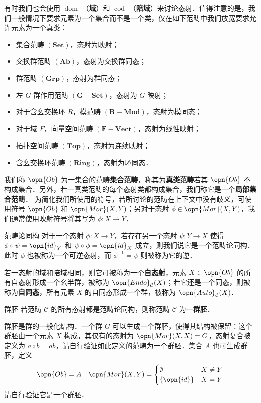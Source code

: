 有时我们也会使用 $\operatorname{dom}$ （\textbf{域}）和 $\operatorname{cod}$ （\textbf{陪域}）来讨论态射．值得注意的是，我们一般情况下要求元素为一个集合而不是一个类，仅在如下范畴中我们放宽要求允许元素为一个真类：
\begin{itemize}
    \item 集合范畴 $(\mathbf{Set})$，态射为映射；
    \item 交换群范畴 $(\mathbf{Ab})$，态射为交换群同态；
    \item 群范畴 $(\mathbf{Grp})$，态射为群同态；
    \item 左 $G$-群作用范畴 $(\mathbf{G{-}Set})$，态射为 $G$-映射；
    \item 对于含幺交换环 $R$，模范畴 $(\mathbf{R{-}Mod})$，态射为模同态；
    \item 对于域 $F$，向量空间范畴 $(\mathbf{F{-}Vect})$，态射为线性映射；
    \item 拓扑空间范畴 $(\mathbf{Top})$，态射为连续映射；
    \item 含幺交换环范畴 $(\mathbf{Ring})$，态射为环同态．
\end{itemize}
我们称 $\opn{Ob}$ 为一集合的范畴\textbf{集合范畴}，称其为\textbf{真类范畴}若其 $\opn{Ob}$ 不构成集合．另外，若一真类范畴的每个态射类都构成集合，我们称它是一个\textbf{局部集合范畴}．
为简化我们所使用的符号，若所讨论的范畴在上下文中没有歧义，可使用符号 $\opn{Ob}$ 和 $\opn{Mor}(X,Y)$；另对于态射 $\phi\in\opn{Mor}(X,Y)$，我们通常使用映射符号将其写为 $\phi:X\to Y$．

\begin{definition}{范畴论同构}
对于一个态射 $\phi:X\to Y$，若存在另一个态射 $\psi:Y\to X$ 使得 $\phi\circ\psi=\opn{id}_Y$ 和 $\psi\circ\phi=\opn{id}_X$ 成立，则我们说它是一个范畴论同构．此时 $\phi$ 也被称为一个可逆态射，而 $\phi^{-1}=\psi$ 则被称为它的逆．
\end{definition}
若一态射的域和陪域相同，则它可被称为一个\textbf{自态射}，元素 $X\in\opn{Ob}$ 的所有自态射形成一个幺半群，被称为 $\opn{Endo}_\mathcal{C}(X)$；若它还是一个同态，则被称为\textbf{自同态}，所有元素 $X$ 的自同态形成一个群，被称为 $\opn{Auto}_\mathcal{C}(X)$．

\begin{definition}{群胚}
若范畴 $\mathcal{C}$ 的所有态射都是范畴论同构，则称范畴 $\mathcal{C}$ 为一\textbf{群胚}．
\end{definition}
群胚是群的一般化结构．一个群 $G$ 可以生成一个群胚，使得其结构被保留：这个群胚由一个元素 $X$ 构成，其仅有的态射为 $\opn{Mor}(X,X)=G$，态射复合被定义为 $a\circ b=ab$，请自行验证如此定义的范畴为一个群胚．集合 $A$ 也可生成群胚，定义
\begin{equation}
\opn{Ob}=A\quad\opn{Mor}(X,Y)=\begin{cases}\emptyset&X\neq Y\\\{\opn{id}\}&X=Y\end{cases}
\end{equation}
请自行验证它是一个群胚．

